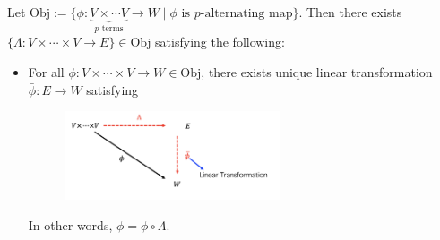 \begin{theorem}
Let $\text{Obj}:=\{\phi:\underbrace{V\times\cdots V}_{\text{$p$ terms}}\to W\mid\phi\text{ is $p$-alternating map}\}$.
Then there exists $\{\Lambda:V\times\cdots\times V\to E\}\in\text{Obj}$ satisfying the following:
\begin{itemize}
\item
For all $\phi:V\times\cdots\times V\to W\in\text{Obj}$, there exists unique linear transformation $\bar{\phi}:E\to W$ satisfying 
\begin{figure}[H]
\centering
\includegraphics[width=0.6\textwidth]{week14/f_21}
\end{figure}
In other words, $\phi=\bar{\phi}\circ\Lambda$.
\end{itemize}
\end{theorem}












